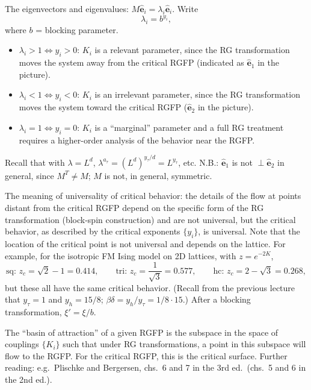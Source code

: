 The eigenvectors and eigenvalues: $M\hat{\mathbf e}_i = \lambda_i\hat{\mathbf e}_i$. Write
\begin{equation}
  \lambda_i = b^{y_i},
\end{equation}
where $b$ = blocking parameter.
\begin{itemize}
  \item $\lambda_i>1\Leftrightarrow y_i>0$: $K_i$ is a relevant parameter, since the RG transformation
    moves the system away from the critical RGFP (indicated as $\hat{\mathbf e}_1$ in the picture).
  \item $\lambda_i<1\Leftrightarrow y_i<0$: $K_i$ is an irrelevant parameter, since the RG transformation
    moves the system toward the critical RGFP ($\hat{\mathbf e}_2$ in the picture).
  \item $\lambda_i = 1\Leftrightarrow y_i = 0$: $K_i$ is a ``marginal'' parameter and a full RG treatment
    requires a higher-order analysis of the behavior near the RGFP.
\end{itemize}
Recall that with $\lambda = L^d$, $\lambda^{a_\tau} = (L^d)^{y_\tau/d} = L^{y_\tau}$, etc. N.B.:
$\hat{\mathbf e}_1$ is not $\perp\hat{\mathbf e}_2$ in general, since $M^T\ne M$; $M$ is not, in general,
symmetric.

The meaning of universality of critical behavior: the details of the flow at points distant from the
critical RGFP depend on the specific form of the RG transformation (block-spin construction) and are not
universal, but the critical behavior, as described by the critical exponents $\{y_i\}$, is universal. Note
that the location of the critical point is not universal and depends on the lattice. For example, for the
isotropic FM Ising model on 2D lattices, with $z = e^{-2K}$,
\begin{equation}
  \text{sq: } z_c = \sqrt2-1 = 0.414,\qquad
  \text{tri: } z_c = \frac{1}{\sqrt3} = 0.577,\qquad
  \text{hc: } z_c = 2-\sqrt3 = 0.268,
\end{equation}
but these all have the same critical behavior. (Recall from the previous lecture that $y_\tau = 1$ and
$y_h = 15/8$; $\beta\delta = y_h/y_\tau = 1/8\cdot 15$.) After a blocking
transformation, $\xi' = \xi/b$.

The ``basin of attraction'' of a given RGFP is the subspace in the space of couplings $\{K_i\}$ such that
under RG transformations, a point in this subspace will flow to the RGFP. For the critical RGFP, this is
the critical surface. Further reading: e.g.\ Plischke and Bergersen, chs.~6 and 7 in the 3rd ed.\ (chs.~5
and 6 in the 2nd ed.).

